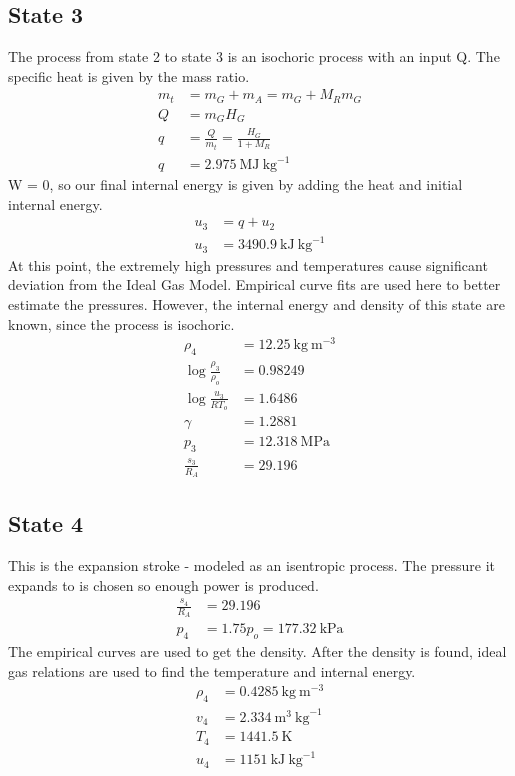 \documentclass[10pt,a4paper]{article}
\begin{document}
	\subsection{State 3}
	The process from state 2 to state 3 is an isochoric process with an input Q. The specific heat is given by the mass ratio.
	\begin{align}
		m_t &= m_G + m_A = m_G + M_R m_G \\
		Q &= m_G H_G \\
		q &= \frac{Q}{m_t} = \frac{H_G}{1 + M_R}\\
		q &= 2.975\ \text{MJ}\ \text{kg}^{-1}
	\end{align}
	W = 0, so our final internal energy is given by adding the heat and initial internal energy.
	\begin{align}
		u_3 &= q + u_2\\
		u_3 &= 3490.9\ \text{kJ}\ \text{kg}^{-1}
	\end{align}
	At this point, the extremely high pressures and temperatures cause significant deviation from the Ideal Gas Model. Empirical curve fits are used here to better estimate the pressures.
	However, the internal energy and density of this state are known, since the process is isochoric.
	\begin{align}
		\rho_4 &=  12.25\ \text{kg}\ \text{m}^{-3}\\
		\log \frac{\rho_3}{\rho_o} &= 0.98249\\
		\log \frac{u_3}{R T_o} &= 1.6486\\
		\gamma &= 1.2881\\		
		p_3 &= 12.318\ \text{MPa}\\
		\frac{s_3}{R_A} &= 29.196
	\end{align}
	\subsection{State 4}
	This is the expansion stroke - modeled as an isentropic process. The pressure it expands to is chosen so enough power is produced.
	\begin{align}
		\frac{s_4}{R_A} &= 29.196\\
		p_4 &= 1.75 p_o = 177.32\ \text{kPa}
	\end{align}
	The empirical curves are used to get the density. After the density is found, ideal gas relations are used to find the temperature and internal energy.
	\begin{align}
		\rho_4 &= 0.4285\ \text{kg}\ \text{m}^{-3}\\
		v_4 &= 2.334\ \text{m}^3\ \text{kg}^{-1}\\
		T_4 &= 1441.5\ \text{K}\\
		u_4 &= 1151\ \text{kJ}\ \text{kg}^{-1}
	\end{align}
\end{document}
